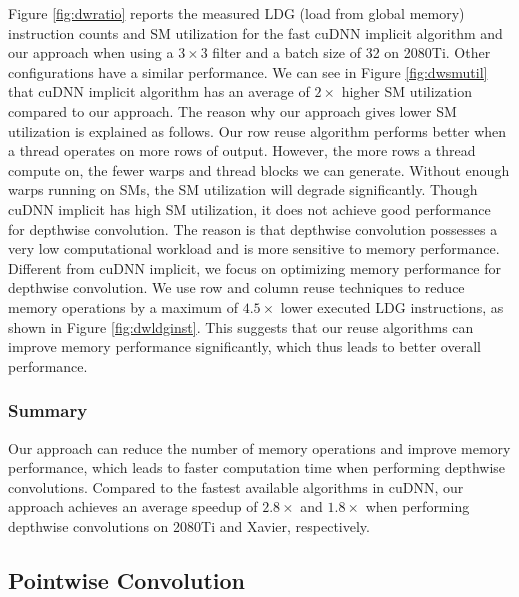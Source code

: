 Figure \ref{fig:dwratio} reports the measured LDG (load from global memory) instruction counts and SM utilization for the fast cuDNN implicit algorithm and our approach when using a $3 \times 3$ filter and a batch size of 32 on 2080Ti. Other configurations have a similar performance. 
We can see in Figure \ref{fig:dwsmutil} that cuDNN implicit algorithm has an average of $2\times$ higher SM utilization compared to our approach.
The reason why our approach gives lower SM utilization is explained as follows. 
Our row reuse algorithm performs better when a thread operates on more rows of output.
However, the more rows a thread compute on, the fewer warps and thread blocks we can generate. Without enough warps running on SMs, the SM utilization will degrade significantly.
Though cuDNN implicit has high SM utilization, it does not achieve good performance for depthwise convolution. 
The reason is that depthwise convolution possesses a very low computational workload and is more sensitive to memory performance.
Different from cuDNN implicit, we focus on optimizing memory performance for depthwise convolution. We use row and column reuse techniques to reduce memory operations by a maximum of $4.5\times$ lower executed LDG instructions, as shown in Figure \ref{fig:dwldginst}.
This suggests that our reuse algorithms can improve memory performance significantly, which thus leads to better overall performance.

\subsubsection{Summary}
Our approach can reduce the number of memory operations and improve memory performance, which leads to faster computation time when performing depthwise convolutions.  
Compared to the fastest available algorithms in cuDNN, our approach achieves an average speedup of $2.8\times$ and $1.8\times$ when performing depthwise convolutions on 2080Ti and Xavier, respectively.


\subsection{Pointwise Convolution}
\label{sec:pwconvexp}

